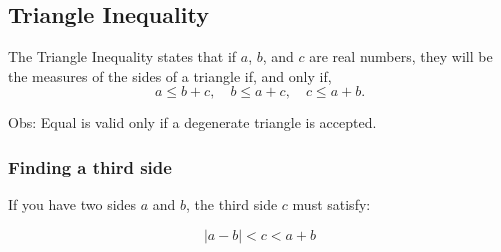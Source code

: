 \subsection{Triangle Inequality}

The Triangle Inequality states that if \(a\), \(b\), and \(c\) are real numbers, they will be the measures of the sides of a triangle if, and only if,
\[
a \leq b + c, \quad b \leq a + c, \quad c \leq a + b.
\]

Obs: Equal is valid only if a degenerate triangle is accepted.

\subsubsection{Finding a third side}

If you have two sides $a$ and $b$, the third side $c$ must satisfy:

\[
| a - b | < c < a + b
\]
